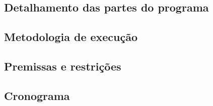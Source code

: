 \documentclass[11pt]{article}
\begin{document}
    \hypertarget{detalhamento-das-partes-do-programa}{%
\subsection{Detalhamento das partes do
programa}\label{detalhamento-das-partes-do-programa}}

    \hypertarget{metodologia-de-execuuxe7uxe3o}{%
\subsection{Metodologia de
execução}\label{metodologia-de-execuuxe7uxe3o}}

    \hypertarget{premissas-e-restriuxe7uxf5es}{%
\subsection{Premissas e restrições}\label{premissas-e-restriuxe7uxf5es}}

    \hypertarget{cronograma}{%
\subsection{Cronograma}\label{cronograma}}


    
    
    
    
\end{document}
